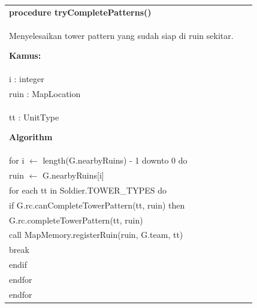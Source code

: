 \documentclass{article}
\newenvironment{pseudobox}
{
\centering
\begin{longtable}{|p{0.94\linewidth}|}
\hline
}
{
\\ \hline
\end{longtable}
\vspace{0.05cm}
}
\begin{document}
\begin{pseudobox}
\textbf{procedure tryCompletePatterns()} \\
{ Menyelesaikan tower pattern yang sudah siap di ruin sekitar. }

\textbf{Kamus:} \\
\hspace*{1em} i : integer \\
\hspace*{1em} ruin : MapLocation \\
\hspace*{1em} tt : UnitType

\textbf{Algorithm} \\
\hspace*{1em} for i $\leftarrow$ length(G.nearbyRuins) - 1 downto 0 do \\
\hspace*{2em} ruin $\leftarrow$ G.nearbyRuins[i] \\
\hspace*{2em} for each tt in Soldier.TOWER\_TYPES do \\
\hspace*{3em} if G.rc.canCompleteTowerPattern(tt, ruin) then \\
\hspace*{4em} G.rc.completeTowerPattern(tt, ruin) \\
\hspace*{4em} call MapMemory.registerRuin(ruin, G.team, tt) \\
\hspace*{4em} break \\
\hspace*{3em} endif \\
\hspace*{2em} endfor \\
\hspace*{1em} endfor
\end{pseudobox}
\end{document}
